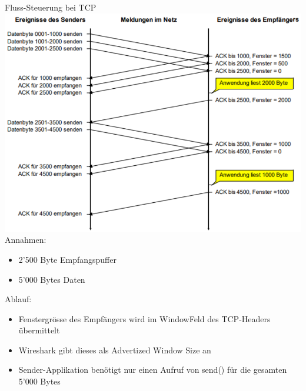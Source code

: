 \begin{example2}{Fluss-Steuerung bei TCP}\\
        \includegraphics[width=1\linewidth]{images/flusssteuerung_tcp.png}\\
    Annahmen:
    \begin{itemize}
        \item 2'500 Byte Empfangspuffer
        \item 5'000 Bytes Daten
    \end{itemize}
    Ablauf:
    \begin{itemize}
        \item Fenstergrösse des Empfängers wird im WindowFeld des TCP-Headers übermittelt
        \item Wireshark gibt dieses als Advertized Window Size an
        \item Sender-Applikation benötigt nur einen Aufruf von send() für die gesamten 5'000 Bytes
    \end{itemize}
\end{example2}

